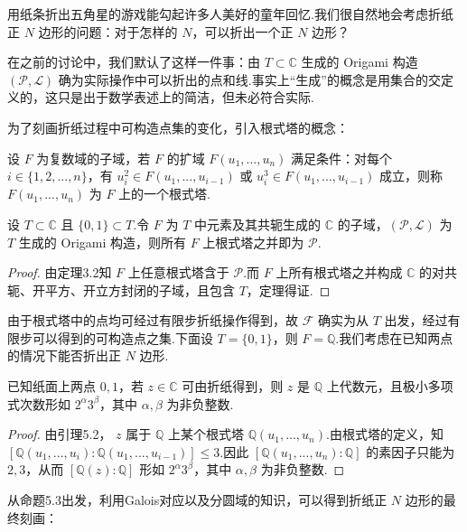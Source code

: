 用纸条折出五角星的游戏能勾起许多人美好的童年回忆.我们很自然地会考虑折纸正 $N$ 边形的问题：对于怎样的 $N$，可以折出一个正 $N$ 边形？

在之前的讨论中，我们默认了这样一件事：由 $T\subset\mathbb{C}$ 生成的 Origami 构造 $(\mathcal{P},\mathcal{L})$ 确为实际操作中可以折出的点和线.事实上“生成”的概念是用集合的交定义的，这只是出于数学表述上的简洁，但未必符合实际.

为了刻画折纸过程中可构造点集的变化，引入根式塔的概念：

\begin{definition}
    设 $F$ 为复数域的子域，若 $F$ 的扩域 $F(u_1,...,u_n)$ 满足条件：对每个 $i\in\{1,2,...,n\}$，有 $u_i^2\in F(u_1,...,u_{i-1})$ 或 $u_i^3\in F(u_1,...,u_{i-1})$ 成立，则称 $F(u_1,...,u_n)$ 为 $F$ 上的一个根式塔.
\end{definition}

\begin{lemma}
    设 $T\subset\mathbb{C}$ 且 $\{0,1\}\subset T$.令 $F$ 为 $T$ 中元素及其共轭生成的 $\mathbb{C}$ 的子域，$(\mathcal{P},\mathcal{L})$ 为 $T$ 生成的 Origami 构造，则所有 $F$ 上根式塔之并即为 $\mathcal{P}$.
\end{lemma}

\begin{proof}
    由定理3.2知 $F$ 上任意根式塔含于 $\mathcal{P}$.而 $F$ 上所有根式塔之并构成 $\mathbb{C}$ 的对共轭、开平方、开立方封闭的子域，且包含 $T$，定理得证.
\end{proof}

由于根式塔中的点均可经过有限步折纸操作得到，故 $\mathcal{F}$ 确实为从 $T$ 出发，经过有限步可以得到的可构造点之集.下面设 $T=\{0,1\}$，则 $F=\mathbb{Q}$.我们考虑在已知两点的情况下能否折出正 $N$ 边形.

\begin{proposition}
    已知纸面上两点 $0,1$，若 $z\in\mathbb{C}$ 可由折纸得到，则 $z$ 是 $\mathbb{Q}$ 上代数元，且极小多项式次数形如 $2^\alpha 3^\beta$，其中 $\alpha,\beta$ 为非负整数.
\end{proposition}

\begin{proof}
    由引理5.2， $z$ 属于 $\mathbb{Q}$ 上某个根式塔 $\mathbb{Q}(u_1,...,u_n)$.由根式塔的定义，知 $[\mathbb{Q}(u_1,...,u_i):\mathbb{Q}(u_1,...,u_{i-1})]\leq 3$.因此 $[\mathbb{Q}(u_1,...,u_n):\mathbb{Q}]$ 的素因子只能为 $2,3$，从而 $[\mathbb{Q}(z):\mathbb{Q}]$ 形如 $2^\alpha 3^\beta$，其中 $\alpha,\beta$ 为非负整数.
\end{proof}

从命题5.3出发，利用Galois对应以及分圆域的知识，可以得到折纸正 $N$ 边形的最终刻画：

